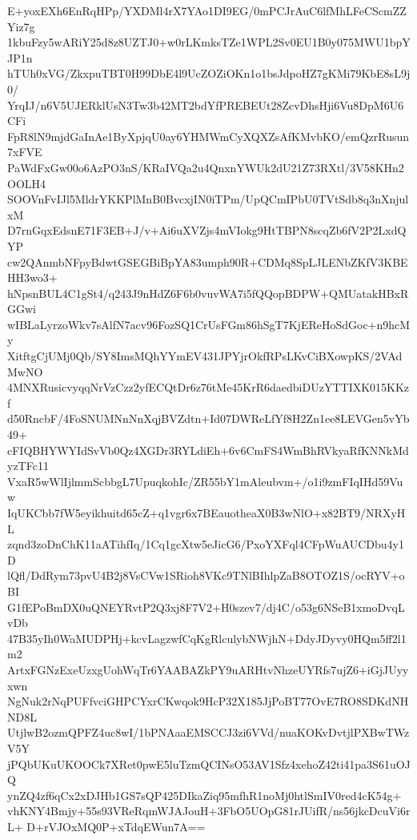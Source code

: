 E+yoxEXh6EnRqHPp/YXDMl4rX7YAo1DI9EG/0mPCJrAuC6lfMhLFeCScmZZYiz7g
1kbuFzy5wARiY25d8z8UZTJ0+w0rLKmksTZe1WPL2Sv0EU1B0y075MWU1bpYJP1n
hTUh0xVG/ZkxpuTBT0H99DbE4l9UcZOZiOKn1o1bsJdpoHZ7gKMi79KbE8sL9j0/
YrqIJ/n6V5UJERklUsN3Tw3b42MT2bdYfPREBEUt28ZcvDhsHji6Vu8DpM6U6CFi
FpR8lN9mjdGaInAe1ByXpjqU0ay6YHMWmCyXQXZsAfKMvbKO/emQzrRusun7xFVE
PaWdFxGw00o6AzPO3nS/KRaIVQa2u4QnxnYWUk2dU21Z73RXtl/3V58KHn2OOLH4
SOOVnFvIJl5MldrYKKPlMnB0BvcxjIN0iTPm/UpQCmIPbU0TVtSdb8q3nXnjulxM
D7rnGqxEdsnE71F3EB+J/v+Ai6uXVZjs4mVIokg9HtTBPN8scqZb6fV2P2LxdQYP
cw2QAnmbNFpyBdwtGSEGBiBpYA83umph90R+CDMq8SpLJLENbZKfV3KBEHH3wo3+
hNpsnBUL4C1gSt4/q243J9nHdZ6F6b0vuvWA7i5fQQopBDPW+QMUatakHBxRGGwi
wIBLaLyrzoWkv7sAlfN7acv96FozSQ1CrUsFGm86hSgT7KjEReHoSdGoc+n9hcMy
XitftgCjUMj0Qb/SY8ImsMQhYYmEV431JPYjrOkfRPsLKvCiBXowpKS/2VAdMwNO
4MNXRusicvyqqNrVzCzz2yfECQtDr6z76tMe45KrR6daedbiDUzYTTIXK015KKzf
d50RncbF/4FoSNUMNnNnXqjBVZdtn+Id07DWReLfYf8H2Zn1ee8LEVGen5vYb49+
cFIQBHYWYIdSvVb0Qz4XGDr3RYLdiEh+6v6CmFS4WmBhRVkyaRfKNNkMdyzTFc11
VxaR5wWlIjlmmScbbgL7UpuqkohIc/ZR55bY1mAleubvm+/o1i9zmFIqIHd59Vuw
IqUKCbb7fW5eyikhuitd65cZ+q1vgr6x7BEauotheaX0B3wNlO+x82BT9/NRXyHL
zqnd3zoDnChK11aATihfIq/1Cq1gcXtw5eJicG6/PxoYXFql4CFpWuAUCDbu4y1D
lQfl/DdRym73pvU4B2j8VsCVw1SRioh8VKc9TNlBIhlpZaB8OTOZ1S/ocRYV+oBI
G1fEPoBmDX0uQNEYRvtP2Q3xj8F7V2+H0szev7/dj4C/o53g6NSeB1xmoDvqLvDb
47B35yIh0WaMUDPHj+kcvLagzwfCqKgRlculybNWjhN+DdyJDyvy0HQm5ff2l1m2
ArtxFGNzExeUzxgUohWqTr6YAABAZkPY9uARHtvNhzeUYRfs7ujZ6+iGjJUyyxwn
NgNuk2rNqPUFfvciGHPCYxrCKwqok9HcP32X185JjPoBT77OvE7RO8SDKdNHND8L
UtjlwB2ozmQPFZ4uc8wI/1bPNAaaEMSCCJ3zi6VVd/nuaKOKvDvtjlPXBwTWzV5Y
jPQbUKuUKOOCk7XRet0pwE5luTzmQCINsO53AV1Sfz4xehoZ42ti41pa3S61uOJQ
ynZQ4zf6qCx2xDJHb1GS7sQP425DIkaZiq95mfhR1noMj0htlSmIV0red4cK54g+
vhKNY4Bmjy+55s93VReRqmWJAJouH+3FbO5UOpG81rJUifR/ns56jkcDcuVi6rL+
D+rVJOxMQ0P+xTdqEWun7A==
